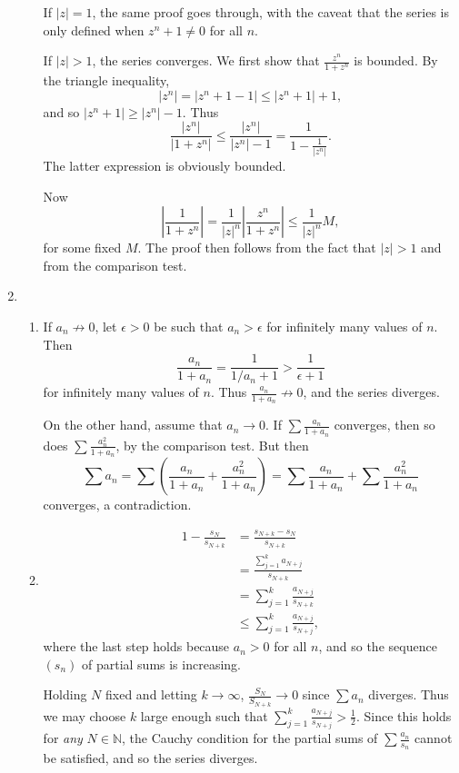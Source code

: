 \documentclass{article}
\begin{document}
\begin{enumerate}[label=\textbf{\arabic*.}]
\begin{enumerate}
If $|z| = 1$, the same proof goes through, with the caveat that the series is only defined when $z^n + 1 \neq 0$ for all $n$.

If $|z| > 1$, the series converges. We first show that $\frac{z^n}{1+z^n}$ is bounded. By the triangle inequality, \[|z^n| = |z^n + 1 - 1| \leq |z^n + 1| + 1,\] and so $|z^n + 1| \geq |z^n| - 1$. Thus \[\frac{|z^n|}{|1+z^n|} \leq \frac{|z^n|}{|z^n| - 1} = \frac{1}{1 - \frac{1}{|z^n|}}.\] The latter expression is obviously bounded.

Now \[\left|\frac{1}{1+z^n}\right| = \frac{1}{|z|^n}\left|\frac{z^n}{1+z^n}\right| \leq \frac{1}{|z|^n} M,\] for some fixed $M$. The proof then follows from the fact that $|z| > 1$ and from the comparison test.
\end{enumerate}
\setcounter{enumi}{10}
\item \begin{enumerate}
\item If $a_n\not\to 0$, let $\epsilon > 0$ be such that $a_n > \epsilon$ for infinitely many values of $n$. Then \[\frac{a_n}{1+a_n} = \frac{1}{1/a_n+1} > \frac{1}{\epsilon+1}\] for infinitely many values of $n$. Thus $\frac{a_n}{1+a_n}\not\to 0$, and the series diverges.

On the other hand, assume that $a_n\to 0$. If $\sum\frac{a_n}{1+a_n}$ converges, then so does $\sum\frac{a_n^2}{1+a_n}$, by the comparison test. But then \[\sum a_n = \sum\left(\frac{a_n}{1+a_n} + \frac{a_n^2}{1+a_n}\right) = \sum\frac{a_n}{1+a_n} + \sum\frac{a_n^2}{1+a_n}\] converges, a contradiction.
\item \begin{align*}
1 - \frac{s_N}{s_{N+k}} &= \frac{s_{N+k}-s_N}{s_{N+k}}\\
	&= \frac{\sum_{j=1}^k a_{N+j}}{s_{N+k}}\\
	&= \sum_{j=1}^k \frac{a_{N+j}}{s_{N+k}}\\
	&\leq \sum_{j=1}^k \frac{a_{N+j}}{s_{N+j}},
\end{align*}
where the last step holds because $a_n > 0$ for all $n$, and so the sequence $(s_n)$ of partial sums is increasing.

Holding $N$ fixed and letting $k\to\infty$, $\frac{S_N}{S_{N+k}}\to 0$ since $\sum a_n$ diverges. Thus we may choose $k$ large enough such that $\sum_{j=1}^k \frac{a_{N+j}}{s_{N+j}} > \frac{1}{2}$. Since this holds for \textit{any} $N\in\mathbb N$, the Cauchy condition for the partial sums of $\sum \frac{a_n}{s_n}$ cannot be satisfied, and so the series diverges.
\end{enumerate}
\end{enumerate}
\end{document}
